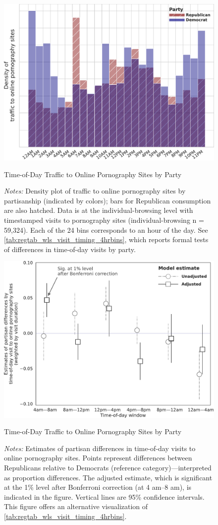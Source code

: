 \documentclass[12pt,twoside]{article}
\begin{document}
\begin{figure}[ht]
\centering
    \includegraphics[width=.75\linewidth]{figs/time-of-day-consumption-by-party.pdf}
\caption{Time-of-Day Traffic to Online Pornography Sites by Party}
\caption*{\footnotesize \emph{Notes:} 
        Density plot of traffic to online pornography sites by partisanship (indicated by colors); bars for Republican consumption are also hatched.
        Data is at the individual-browsing level with timestamped visits to pornography sites (individual-browsing n = 59,324).
        Each of the 24 bins corresponds to an hour of the day.
        See \cref{tab:regtab_wls_visit_timing_4hrbins}, which reports formal tests of differences in time-of-day visits by party.
	}
    \label{fig:time-of-day-consumption-by-party}
\end{figure}

\begin{figure}[!ht]
\centering
    \includegraphics[width=.85\linewidth]{figs/time-of-day-wls-estimates.pdf}
\caption{Time-of-Day Traffic to Online Pornography Sites by Party}
\caption*{\footnotesize \emph{Notes:} 
        Estimates of partisan differences in time-of-day visits to online pornography sites.
        Points represent differences between Republicans relative to Democrats (reference category)---interpreted as proportion differences.
        The adjusted estimate, which is significant at the 1\% level after Bonferroni correction (at 4 am--8 am), is indicated in the figure.
        Vertical lines are 95\% confidence intervals.
        This figure offers an alternative visualization of \cref{tab:regtab_wls_visit_timing_4hrbins}.
	}
    \label{fig:time-of-day-wls-estimates}
\end{figure}
\end{document}
